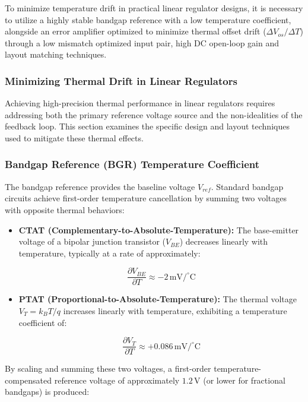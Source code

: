 \documentclass[
]{article}
\begin{document}
To minimize temperature drift in practical linear regulator designs, it
is necessary to utilize a highly stable bandgap reference with a low
temperature coefficient, alongside an error amplifier optimized to
minimize thermal offset drift (\(\Delta V_{os}/\Delta T\)) through a low
mismatch optimized input pair, high DC open-loop gain and layout
matching techniques.

\subsubsection{Minimizing Thermal Drift in Linear
Regulators}\label{_minimizing_thermal_drift_in_linear_regulators}

Achieving high-precision thermal performance in linear regulators
requires addressing both the primary reference voltage source and the
non-idealities of the feedback loop. This section examines the specific
design and layout techniques used to mitigate these thermal effects.

\subsubsection{Bandgap Reference (BGR) Temperature
Coefficient}\label{_bandgap_reference_bgr_temperature_coefficient}

The bandgap reference provides the baseline voltage \(V_{ref}\).
Standard bandgap circuits achieve first-order temperature cancellation
by summing two voltages with opposite thermal behaviors:

\begin{itemize}
\item
  \textbf{CTAT (Complementary-to-Absolute-Temperature):} The
  base-emitter voltage of a bipolar junction transistor (\(V_{BE}\))
  decreases linearly with temperature, typically at a rate of
  approximately:

  \[\frac{\partial V_{BE}}{\partial T} \approx -2 \, \text{mV}/^\circ\text{C}\]
\item
  \textbf{PTAT (Proportional-to-Absolute-Temperature):} The thermal
  voltage \(V_T = k_B T / q\) increases linearly with temperature,
  exhibiting a temperature coefficient of:

  \[\frac{\partial V_T}{\partial T} \approx +0.086 \, \text{mV}/^\circ\text{C}\]
\end{itemize}

By scaling and summing these two voltages, a first-order
temperature-compensated reference voltage of approximately
\(1.2 \, \text{V}\) (or lower for fractional bandgaps) is produced:
\end{document}
